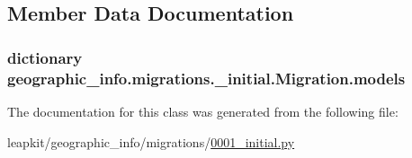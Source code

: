 \subsection{Member Data Documentation}
\hypertarget{classgeographic__info_1_1migrations_1_10001__initial_1_1_migration_a19a57c6605f5393e0e78fd88b99db350}{
\subsubsection[{models}]{\setlength{\rightskip}{0pt plus 5cm}dictionary geographic\-\_\-info.\-migrations.\-\_\-initial.\-Migration.\-models\hspace{0.3cm}{\ttfamily [static]}}}\label{classgeographic__info_1_1migrations_1_10001__initial_1_1_migration_a19a57c6605f5393e0e78fd88b99db350}


The documentation for this class was generated from the following file\-:\begin{DoxyCompactItemize}
\item 
leapkit/geographic\-\_\-info/migrations/\hyperlink{geographic__info_2migrations_20001__initial_8py}{0001\-\_\-initial.\-py}\end{DoxyCompactItemize}
